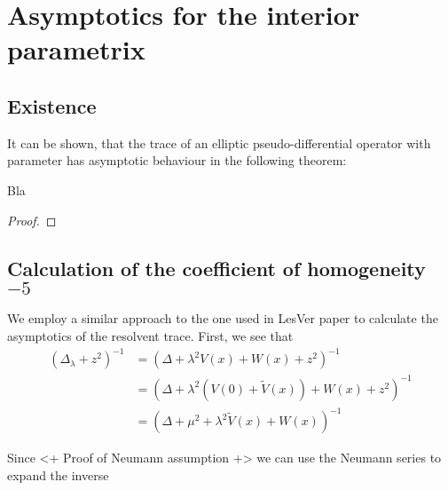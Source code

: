 \section{Asymptotics for the interior parametrix}
\subsection{Existence}
It can be shown, that the trace of an elliptic pseudo-differential operator with
parameter has asymptotic behaviour in the following theorem:
\begin{Theorem}
    Bla
    \begin{proof}
        
    \end{proof}
\end{Theorem}

\subsection{Calculation of the coefficient of homogeneity $-5$}
We employ a similar approach to the one used in LesVer paper to calculate the
asymptotics of the resolvent trace. First, we see that
\begin{align*}
    (\Delta_\lambda + z^2)^{-1} &= (\Delta + \lambda^2 V(x) +
    W(x) + z^2)^{-1} \\
    &= (\Delta + \lambda^2 (V(0) + \tilde V(x)) + W(x) + z^2)^{-1} \\
    &= (\Delta + \mu^2 + \lambda^2 \tilde V(x) + W(x))^{-1}
\end{align*}

Since <+ Proof of Neumann assumption +> we can use the Neumann series to expand
the inverse
